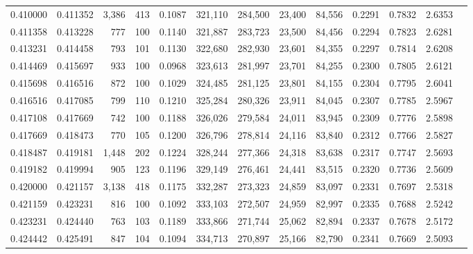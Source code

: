 \begin{tabular}{rrrrrrrrrrrrr}
0.410000 & 0.411352 & 3,386 & 413 &                                     0.1087 & 321,110 & 284,500 &  23,400 &  84,556 & 0.2291 & 0.7832 & 2.6353 \\
0.411358 & 0.413228 &   777 & 100 &                                     0.1140 & 321,887 & 283,723 &  23,500 &  84,456 & 0.2294 & 0.7823 & 2.6281 \\
0.413231 & 0.414458 &   793 & 101 &                                     0.1130 & 322,680 & 282,930 &  23,601 &  84,355 & 0.2297 & 0.7814 & 2.6208 \\
0.414469 & 0.415697 &   933 & 100 &                                     0.0968 & 323,613 & 281,997 &  23,701 &  84,255 & 0.2300 & 0.7805 & 2.6121 \\
0.415698 & 0.416516 &   872 & 100 &                                     0.1029 & 324,485 & 281,125 &  23,801 &  84,155 & 0.2304 & 0.7795 & 2.6041 \\
0.416516 & 0.417085 &   799 & 110 &                                     0.1210 & 325,284 & 280,326 &  23,911 &  84,045 & 0.2307 & 0.7785 & 2.5967 \\
0.417108 & 0.417669 &   742 & 100 &                                     0.1188 & 326,026 & 279,584 &  24,011 &  83,945 & 0.2309 & 0.7776 & 2.5898 \\
0.417669 & 0.418473 &   770 & 105 &                                     0.1200 & 326,796 & 278,814 &  24,116 &  83,840 & 0.2312 & 0.7766 & 2.5827 \\
0.418487 & 0.419181 & 1,448 & 202 &                                     0.1224 & 328,244 & 277,366 &  24,318 &  83,638 & 0.2317 & 0.7747 & 2.5693 \\
0.419182 & 0.419994 &   905 & 123 &                                     0.1196 & 329,149 & 276,461 &  24,441 &  83,515 & 0.2320 & 0.7736 & 2.5609 \\
0.420000 & 0.421157 & 3,138 & 418 &                                     0.1175 & 332,287 & 273,323 &  24,859 &  83,097 & 0.2331 & 0.7697 & 2.5318 \\
0.421159 & 0.423231 &   816 & 100 &                                     0.1092 & 333,103 & 272,507 &  24,959 &  82,997 & 0.2335 & 0.7688 & 2.5242 \\
0.423231 & 0.424440 &   763 & 103 &                                     0.1189 & 333,866 & 271,744 &  25,062 &  82,894 & 0.2337 & 0.7678 & 2.5172 \\
0.424442 & 0.425491 &   847 & 104 &                                     0.1094 & 334,713 & 270,897 &  25,166 &  82,790 & 0.2341 & 0.7669 & 2.5093 \\

\end{tabular}
